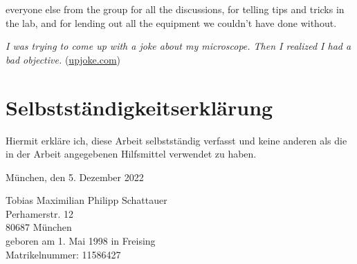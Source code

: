 \begin{minipage}{\textwidth}
everyone else from the group for all the discussions, for telling tips and tricks in the lab, and for lending out all the equipment we couldn't have done without.

\begin{center}
    \small
    \textit{I was trying to come up with a joke about my microscope. Then I realized I had a bad objective.} (\href{https://upjoke.com/microscope-jokes}{upjoke.com})
\end{center}
\end{minipage}




\chapter*{Selbstständigkeitserklärung}
Hiermit erkläre ich, diese Arbeit selbstständig verfasst und keine anderen als die in der Arbeit angegebenen Hilfsmittel verwendet zu haben.

\vspace{5cm}
München, den 5. Dezember 2022

\vspace{3cm}
Tobias Maximilian Philipp Schattauer \\
\ifprintversion
Perhamerstr. 12 \\
80687 München \\
geboren am 1. Mai 1998 in Freising \\
Matrikelnummer: 11586427
\fi
